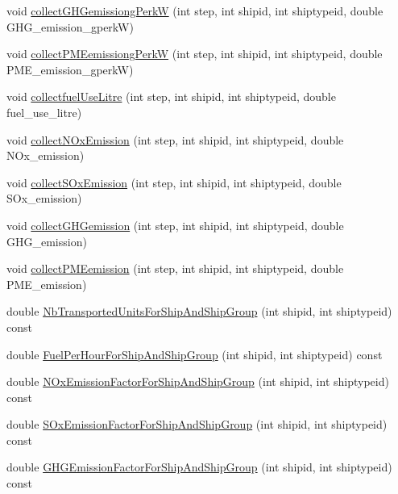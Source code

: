 \begin{DoxyCompactItemize}
\item 
void \mbox{\hyperlink{class_ships_stats_a4162cb85abbf4633e7db3975bd69920c}{collect\+G\+H\+Gemissiong\+PerkW}} (int step, int shipid, int shiptypeid, double G\+H\+G\+\_\+emission\+\_\+gperkW)
\item 
void \mbox{\hyperlink{class_ships_stats_a4c617367fe73aca1eb33514b1984acdf}{collect\+P\+M\+Eemissiong\+PerkW}} (int step, int shipid, int shiptypeid, double P\+M\+E\+\_\+emission\+\_\+gperkW)
\item 
void \mbox{\hyperlink{class_ships_stats_af66de819dc88837e1aaee09d91899296}{collectfuel\+Use\+Litre}} (int step, int shipid, int shiptypeid, double fuel\+\_\+use\+\_\+litre)
\item 
void \mbox{\hyperlink{class_ships_stats_a0cd13c776aa516de361de4f151bcee42}{collect\+N\+Ox\+Emission}} (int step, int shipid, int shiptypeid, double N\+Ox\+\_\+emission)
\item 
void \mbox{\hyperlink{class_ships_stats_a23b7670d4073d50e777ad69cd0c3593d}{collect\+S\+Ox\+Emission}} (int step, int shipid, int shiptypeid, double S\+Ox\+\_\+emission)
\item 
void \mbox{\hyperlink{class_ships_stats_ab520409c15fb63d21826aa445bd37c12}{collect\+G\+H\+Gemission}} (int step, int shipid, int shiptypeid, double G\+H\+G\+\_\+emission)
\item 
void \mbox{\hyperlink{class_ships_stats_a32e7d6dcefcacae5ad107688d731bdf3}{collect\+P\+M\+Eemission}} (int step, int shipid, int shiptypeid, double P\+M\+E\+\_\+emission)
\item 
double \mbox{\hyperlink{class_ships_stats_a20319bb36a031c08949a47aa33548c44}{Nb\+Transported\+Units\+For\+Ship\+And\+Ship\+Group}} (int shipid, int shiptypeid) const
\item 
double \mbox{\hyperlink{class_ships_stats_aaa9a11a9b95578c70e271ddb6a2045f5}{Fuel\+Per\+Hour\+For\+Ship\+And\+Ship\+Group}} (int shipid, int shiptypeid) const
\item 
double \mbox{\hyperlink{class_ships_stats_aee62de283fe26285f62e1b8a6a759f7a}{N\+Ox\+Emission\+Factor\+For\+Ship\+And\+Ship\+Group}} (int shipid, int shiptypeid) const
\item 
double \mbox{\hyperlink{class_ships_stats_ad5dc03bdec4e1f2b436a30fa0801b79f}{S\+Ox\+Emission\+Factor\+For\+Ship\+And\+Ship\+Group}} (int shipid, int shiptypeid) const
\item 
double \mbox{\hyperlink{class_ships_stats_a9d7a465c47494fc96b4e934ba6d1c38e}{G\+H\+G\+Emission\+Factor\+For\+Ship\+And\+Ship\+Group}} (int shipid, int shiptypeid) const

\end{DoxyCompactItemize}
